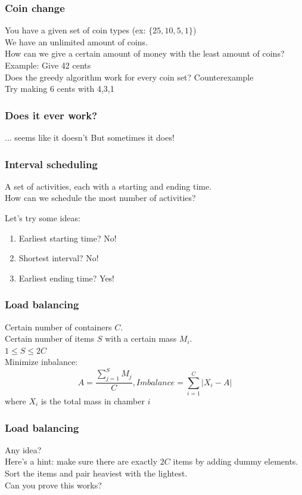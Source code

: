 \documentclass[12pt]{beamer}
\newcommand{\blank}{\vspace{.5cm}}
\begin{document}
\begin{frame}
	\frametitle{Coin change}
	You have a given set of coin types (ex: $\{25,10,5,1\}$)\\
	We have an unlimited amount of coins.\\
	How can we give a certain amount of money with the least amount of coins?\\\pause
	Example: Give 42 cents 
	\\\blank Does the greedy algorithm work for every coin set? Counterexample\\\blank\pause
	Try making 6 cents with {4,3,1}
\end{frame}

\begin{frame}
	\frametitle{Does it ever work?}
	\pause
	... seems like it doesn't\vfill
	\pause
	But sometimes it does!
\end{frame}

\begin{frame}
	\frametitle{Interval scheduling}
	A set of activities, each with a starting and ending time.\\
	How can we schedule the most number of activities?\\\blank
	
	Let's try some ideas:
	\begin{enumerate}
		\item Earliest starting time? \pause \color{red}No!\color{black}\pause
		\item Shortest interval? \pause \color{red}No!\color{black}\pause
		\item Earliest ending time? \pause \color{green}Yes!\color{black}
	\end{enumerate}
\end{frame}

\begin{frame}
	\frametitle{Load balancing}
	Certain number of containers $C$.\\
	Certain number of items $S$ with a certain mass $M_i$.\\
	$1 \leq S \leq 2C$\\
	Minimize inbalance:\\ 
	$$A = \frac{\sum_{j=1}^{S}M_j}{C}, 
	Imbalance = \sum_{i=1}^{C} |X_i - A|$$
	where $X_i$ is the total mass in chamber $i$
\end{frame}

\begin{frame}
	\frametitle{Load balancing}
	Any idea?\\\blank\pause
	Here's a hint: make sure there are exactly $2C$ items by adding dummy elements.\\\blank\pause
	Sort the items and pair heaviest with the lightest.\\\blank
	Can you prove this works?
\end{frame}
\end{document}
